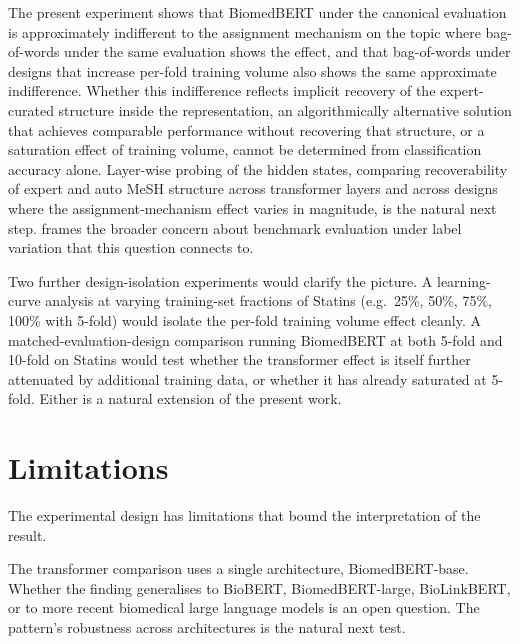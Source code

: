 \documentclass{article}
\begin{document}
The present experiment shows that BiomedBERT under the canonical evaluation is approximately indifferent to the assignment mechanism on the topic where bag-of-words under the same evaluation shows the effect, and that bag-of-words under designs that increase per-fold training volume also shows the same approximate indifference. Whether this indifference reflects implicit recovery of the expert-curated structure inside the representation, an algorithmically alternative solution that achieves comparable performance without recovering that structure, or a saturation effect of training volume, cannot be determined from classification accuracy alone. Layer-wise probing of the hidden states, comparing recoverability of expert and auto MeSH structure across transformer layers and across designs where the assignment-mechanism effect varies in magnitude, is the natural next step.  frames the broader concern about benchmark evaluation under label variation that this question connects to.

Two further design-isolation experiments would clarify the picture. A learning-curve analysis at varying training-set fractions of Statins (e.g.\ 25\%, 50\%, 75\%, 100\% with 5-fold) would isolate the per-fold training volume effect cleanly. A matched-evaluation-design comparison running BiomedBERT at both 5-fold and 10-fold on Statins would test whether the transformer effect is itself further attenuated by additional training data, or whether it has already saturated at 5-fold. Either is a natural extension of the present work.

\section{Limitations}\label{sec:limitations}

The experimental design has limitations that bound the interpretation of the result.

The transformer comparison uses a single architecture, BiomedBERT-base. Whether the finding generalises to BioBERT, BiomedBERT-large, BioLinkBERT, or to more recent biomedical large language models is an open question. The pattern's robustness across architectures is the natural next test.
\end{document}
